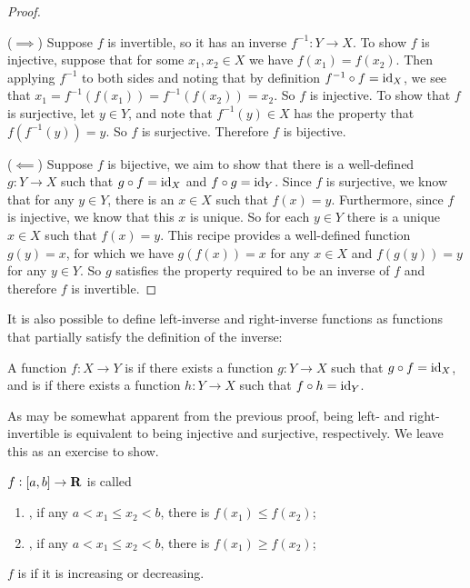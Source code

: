 \begin{proof} \

($\implies$) Suppose $f$ is invertible, so it has an inverse $f^{-1}: Y \to X$. To show $f$ is injective, suppose that for some $x_1, x_2 \in X$ we have $f(x_1) = f(x_2)$. Then applying $f^{-1}$ to both sides and noting that by definition $f^{-1} \circ f = \operatorname{id}_X$, we see that $x_1 = f^{-1}(f(x_1)) = f^{-1}(f(x_2)) = x_2$. So $f$ is injective. To show that $f$ is surjective, let $y \in Y$, and note that $f^{-1}(y) \in X$ has the property that $f(f^{-1}(y)) = y$. So $f$ is surjective. Therefore $f$ is bijective.

($\impliedby$) Suppose $f$ is bijective, we aim to show that there is a well-defined $g:Y \to X$ such that $g \circ f = \operatorname{id}_X$ and $f \circ g = \operatorname{id}_Y$. Since $f$ is surjective, we know that for any $y \in Y$, there is an $x \in X$ such that $f(x) = y$. Furthermore, since $f$ is injective, we know that this $x$ is unique. So for each $y \in Y$ there is a unique $x \in X$ such that $f(x) = y$. This recipe provides a well-defined function $g(y) = x$, for which we have $g(f(x)) = x$ for any $x \in X$ and $f(g(y)) = y$ for any $y \in Y$. So $g$ satisfies the property required to be an inverse of $f$ and therefore $f$ is invertible.
\end{proof}

It is also possible to define left-inverse and right-inverse functions as functions that partially satisfy the definition of the inverse:

\begin{definition}
A function $f:X \to Y$ is  if there exists a function $g:Y \to X$ such that $g \circ f = \operatorname{id}_X$, and is  if there exists a function $h: Y \to X$ such that $f \circ h = \operatorname{id}_Y$.
\end{definition}

As may be somewhat apparent from the previous proof, being left- and right-invertible is equivalent to being injective and surjective, respectively. We leave this as an exercise to show.
\pagebreak

\begin{definition}[Monotonicity]
$f:[a,b]\to\mathbf R$ is called
\begin{enumerate}[label=(\roman*)]
\item {}, if any $a<x_1\le x_2<b$, there is $f(x_1)\le f(x_2)$;
\item {}, if any $a<x_1\le x_2<b$, there is $f(x_1)\ge f(x_2)$;
\end{enumerate}
$f$ is  if it is increasing or decreasing.
\end{definition}

